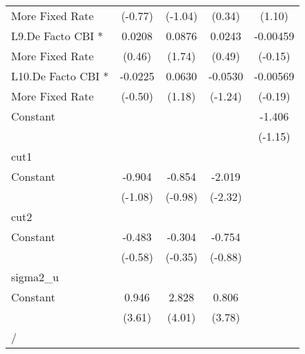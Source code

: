 {\begin{tabular}{l*{4}{c}}
More Fixed Rate     &     (-0.77)         &     (-1.04)         &      (0.34)         &      (1.10)         \\
[1em]
L9.De Facto CBI *   &      0.0208         &      0.0876         &      0.0243         &    -0.00459         \\
More Fixed Rate     &      (0.46)         &      (1.74)         &      (0.49)         &     (-0.15)         \\
[1em]
L10.De Facto CBI *  &     -0.0225         &      0.0630         &     -0.0530         &    -0.00569         \\
More Fixed Rate     &     (-0.50)         &      (1.18)         &     (-1.24)         &     (-0.19)         \\
[1em]
Constant            &                     &                     &                     &      -1.406         \\
                    &                     &                     &                     &     (-1.15)         \\
\hline
cut1                &                     &                     &                     &                     \\
Constant            &      -0.904         &      -0.854         &      -2.019\sym{*}  &                     \\
                    &     (-1.08)         &     (-0.98)         &     (-2.32)         &                     \\
\hline
cut2                &                     &                     &                     &                     \\
Constant            &      -0.483         &      -0.304         &      -0.754         &                     \\
                    &     (-0.58)         &     (-0.35)         &     (-0.88)         &                     \\
\hline
sigma2\_u            &                     &                     &                     &                     \\
Constant            &       0.946\sym{***}&       2.828\sym{***}&       0.806\sym{***}&                     \\
                    &      (3.61)         &      (4.01)         &      (3.78)         &                     \\
\hline
/                   &                     &                     &                     &                     \\

\end{tabular}}

